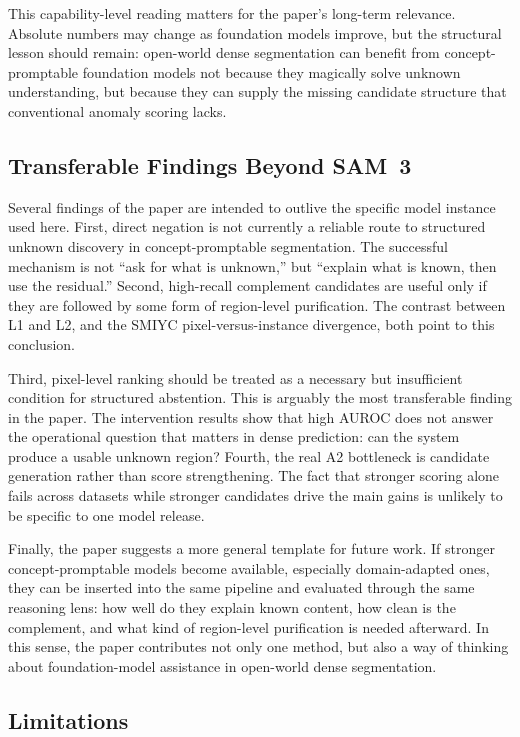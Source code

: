 \documentclass[a4paper,fleqn]{cas-dc}
\newcommand{\samthree}{SAM~3}
\begin{document}
This capability-level reading matters for the paper's long-term relevance. Absolute numbers may change as foundation models improve, but the structural lesson should remain: open-world dense segmentation can benefit from concept-promptable foundation models not because they magically solve unknown understanding, but because they can supply the missing candidate structure that conventional anomaly scoring lacks.

\subsection{Transferable Findings Beyond \samthree{}}
\label{sec:discussion:transfer}

Several findings of the paper are intended to outlive the specific model instance used here. First, direct negation is not currently a reliable route to structured unknown discovery in concept-promptable segmentation. The successful mechanism is not ``ask for what is unknown,'' but ``explain what is known, then use the residual.'' Second, high-recall complement candidates are useful only if they are followed by some form of region-level purification. The contrast between L1 and L2, and the SMIYC pixel-versus-instance divergence, both point to this conclusion.

Third, pixel-level ranking should be treated as a necessary but insufficient condition for structured abstention. This is arguably the most transferable finding in the paper. The intervention results show that high AUROC does not answer the operational question that matters in dense prediction: can the system produce a usable unknown region? Fourth, the real A2 bottleneck is candidate generation rather than score strengthening. The fact that stronger scoring alone fails across datasets while stronger candidates drive the main gains is unlikely to be specific to one model release.

Finally, the paper suggests a more general template for future work. If stronger concept-promptable models become available, especially domain-adapted ones, they can be inserted into the same pipeline and evaluated through the same reasoning lens: how well do they explain known content, how clean is the complement, and what kind of region-level purification is needed afterward. In this sense, the paper contributes not only one method, but also a way of thinking about foundation-model assistance in open-world dense segmentation.

\subsection{Limitations}
\label{sec:discussion:limitations}
\end{document}
